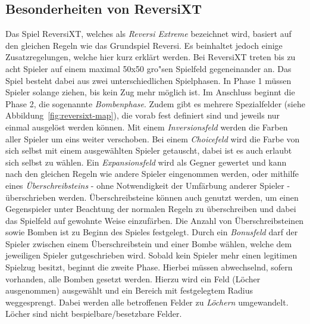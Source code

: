 \subsection{Besonderheiten von ReversiXT}\label{subsec:besonderheiten-von-reversixt}
Das Spiel ReversiXT, welches als \emph{Reversi Extreme} bezeichnet wird, basiert auf den gleichen Regeln wie das Grundspiel Reversi.
Es beinhaltet jedoch einige Zusatzregelungen, welche hier kurz erkl\"art werden.
Bei ReversiXT treten bis zu acht Spieler auf einem maximal 50x50 gro"sen Spielfeld gegeneinander an.
Das Spiel besteht dabei aus zwei unterschiedlichen Spielphasen.
In Phase 1 m\"ussen Spieler solange ziehen, bis kein Zug mehr m\"oglich ist.
Im Anschluss beginnt die Phase 2, die sogenannte \emph{Bombenphase}.
Zudem gibt es mehrere Spezialfelder (siehe Abbildung~\ref{fig:reversixt-map}), die vorab fest definiert sind und jeweils nur einmal ausgel\"ost werden k\"onnen.
Mit einem \emph{Inversionsfeld} werden die Farben aller Spieler um eins weiter verschoben.
Bei einem \emph{Choicefeld} wird die Farbe von sich selbst mit einem ausgew\"ahlten Spieler getauscht, dabei ist es auch erlaubt sich selbst zu w\"ahlen.
Ein \emph{Expansionsfeld} wird als Gegner gewertet und kann nach den gleichen Regeln wie andere Spieler eingenommen werden, oder mithilfe eines \emph{\"Uberschreibsteins} - ohne Notwendigkeit der Umf\"arbung anderer Spieler - \"uberschrieben werden.
\"Uberschreibsteine k\"onnen auch genutzt werden, um einen Gegenspieler unter Beachtung der normalen Regeln zu \"uberschreiben und dabei das Spielfeld auf gewohnte Weise einzuf\"arben.
Die Anzahl von \"Uberschreibsteinen sowie Bomben ist zu Beginn des Spieles festgelegt.
Durch ein \emph{Bonusfeld} darf der Spieler zwischen einem \"Uberschreibstein und einer Bombe w\"ahlen, welche dem jeweiligen Spieler gutgeschrieben wird.
Sobald kein Spieler mehr einen legitimen Spielzug besitzt, beginnt die zweite Phase.
Hierbei m\"ussen abwechselnd, sofern vorhanden, alle Bomben gesetzt werden.
Hierzu wird ein Feld (L\"ocher ausgenommen) ausgew\"ahlt und ein Bereich mit festgelegtem Radius weggesprengt.
Dabei werden alle betroffenen Felder zu \emph{L\"ochern} umgewandelt.
L\"ocher sind nicht bespielbare/besetzbare Felder.

